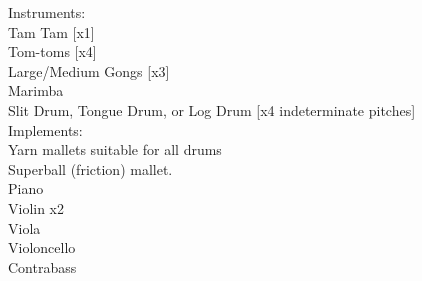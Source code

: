 \documentclass[11pt]{article}
\begin{document}
\hspace*{2cm} Instruments:
\\
\hspace*{3cm} Tam Tam [x1]
\\
\hspace*{3cm} Tom-toms [x4]
\\
\hspace*{3cm} Large/Medium Gongs [x3]
\\
\hspace*{3cm} Marimba
\\
\hspace*{3cm} Slit Drum, Tongue Drum, or Log Drum [x4 indeterminate pitches]
\\
\hspace*{2cm} Implements:
\\
\hspace*{3cm} Yarn mallets suitable for all drums
\\
\hspace*{3cm} Superball (friction) mallet.
\\
\hspace*{1cm} Piano
\\
\hspace*{1cm} Violin x2
\\
\hspace*{1cm} Viola
\\
\hspace*{1cm} Violoncello
\\
\hspace*{1cm} Contrabass

\vspace*{1.25\baselineskip}
\end{document}
